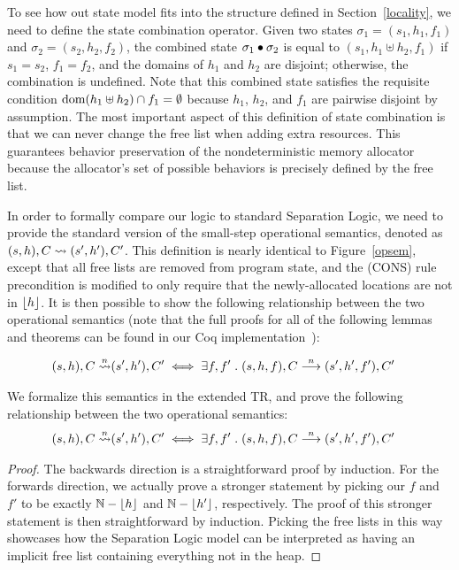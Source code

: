 To see how out state model fits into the structure defined in Section~\ref{locality},
we need to define the state combination operator. Given two states $\sigma_1 = (s_1,h_1,f_1)$ and
$\sigma_2 = (s_2,h_2,f_2)$, the combined state $\sigma_1 \bullet \sigma_2$ is equal to 
$(s_1,h_1 \uplus h_2,f_1)$ if $s_1 = s_2$, $f_1 = f_2$, and the domains of $h_1$ and $h_2$ are
disjoint; otherwise, the combination is undefined. Note that this combined state satisfies the
requisite condition $\text{dom}(h_1 \uplus h_2) \cap f_1 = \emptyset$ because $h_1$, $h_2$, and $f_1$
are pairwise disjoint by assumption. The most important aspect of this definition of state 
combination is that we can never change the free list when adding extra resources. This guarantees
behavior preservation of the nondeterministic memory allocator because the allocator's set of 
possible behaviors is precisely defined by the free list.

In order to formally compare our logic to standard Separation Logic, we 
need to provide the standard version of the small-step operational semantics,
denoted as $(s,h),C \leadsto (s',h'),C'$. This definition is nearly identical
to Figure~\ref{opsem}, except that all free lists are removed from program
state, and the (CONS) rule precondition is modified to only require that
the newly-allocated locations are not in $\lfloor h \rfloor$.
\ifextended
It is then possible to show the following relationship between the
two operational semantics (note that the full proofs for all of the following 
lemmas and theorems can be found in our Coq implementation~\cite{costanzo-thesis}):

\begin{lem}
\label{opequiv}
\begin{align*}
(s,h),C \stackrel{n}{\leadsto} & (s',h'),C' \iff \exists f,f' \hspace{1mm} . \hspace{1mm} (s,h,f),C \stackrel{n}{\longrightarrow} (s',h',f'),C'
\end{align*}
\end{lem}
\else
We formalize this semantics in the extended TR, and prove the following relationship between the
two operational semantics:
{\small
\begin{align*}
(s,h),C \stackrel{n}{\leadsto} & (s',h'),C' \iff \exists f,f' \hspace{1mm} . \hspace{1mm} (s,h,f),C \stackrel{n}{\longrightarrow} (s',h',f'),C'
\end{align*}}
\fi
\ifextended
\begin{proof}
The backwards direction is a straightforward proof by induction. For the forwards direction, we actually
prove a stronger statement by picking our $f$ and $f'$ to be exactly $\mathbb{N}-\lfloor h \rfloor$ and $\mathbb{N}-\lfloor h' \rfloor$,
respectively. The proof of this stronger statement is then straightforward by induction. Picking the free
lists in this way showcases how the Separation Logic model can be interpreted as having an implicit free list
containing everything not in the heap.
\end{proof}

